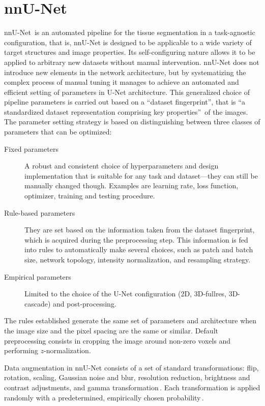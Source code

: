 \section{nnU-Net} \label{sec:nnUNet}
nnU-Net\,\cite{Isensee2021, nnUNet} is an automated pipeline for the tissue segmentation in a task-agnostic configuration, that is, nnU-Net is designed to be applicable to a wide variety of target structures and image properties. Its self-configuring nature allows it to be applied to arbitrary new datasets without manual intervention. nnU-Net does not introduce new elements in the network architecture, but by systematizing the complex process of manual tuning it manages to achieve an automated and efficient setting of parameters in U-Net architecture. This generalized choice of pipeline parameters is carried out based on a \enquote{dataset fingerprint}, that is \enquote{a standardized dataset representation comprising key properties}\,\cite{Isensee2021} of the images. The parameter setting strategy is based on distinguishing between three classes of parameters that can be optimized:
\begin{description}
    \item[Fixed parameters] A robust and consistent choice of hyperparameters and design implementation that is suitable for any task and dataset---they can still be manually changed though. Examples are learning rate, loss function, optimizer, training and testing procedure.
    \item[Rule-based parameters] They are set based on the information taken from the dataset fingerprint, which is acquired during the preprocessing step. This information is fed into rules to automatically make several choices, such as patch and batch size, network topology, intensity normalization, and resampling strategy.
    \item[Empirical parameters] Limited to the choice of the U-Net configuration (2D, 3D-fullres, 3D-cascade) and post-processing.
\end{description}
The rules established generate the same set of parameters and architecture when the image size and the pixel spacing are the same or similar. Default preprocessing consists in cropping the image around non-zero voxels and performing $z$-normalization.

Data augmentation in nnU-Net consists of a set of standard transformations: flip, rotation, scaling, Gaussian noise and blur, resolution reduction, brightness and contrast adjustments, and gamma transformation\,\cite{nnUNet}. Each transformation is applied randomly with a predetermined, empirically chosen probability\,\cite{Isensee2021}.

